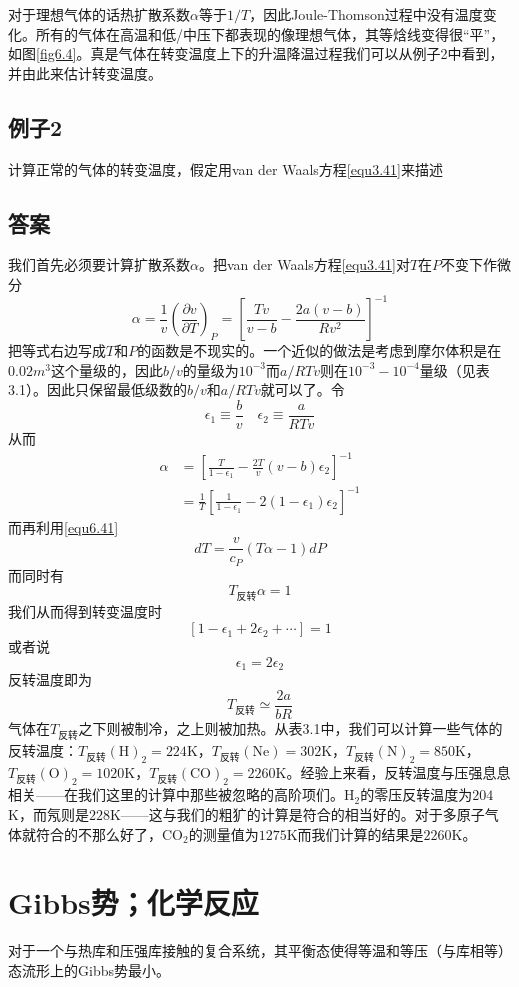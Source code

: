 对于理想气体的话热扩散系数$\alpha$等于$1/T$，因此Joule-Thomson过程中没有温度变化。所有的气体在高温和低/中压下都表现的像理想气体，其等焓线变得很“平”，如图\ref{fig6.4}。真是气体在转变温度上下的升温降温过程我们可以从例子2中看到，并由此来估计转变温度。

\subsection*{例子2}
计算正常的气体的转变温度，假定用van der Waals方程\eqref{equ3.41}来描述
\subsection*{答案}
我们首先必须要计算扩散系数$\alpha$。把van der Waals方程\eqref{equ3.41}对$T$在$P$不变下作微分
\[\alpha = \frac{1}{v}\left(\frac{\partial v}{\partial T}\right)_P=\left[\frac{Tv}{v-b}-\frac{2a(v-b)}{Rv^2}\right]^{-1} \]
把等式右边写成$T$和$P$的函数是不现实的。一个近似的做法是考虑到摩尔体积是在$0.02m^3$这个量级的，因此$b/v$的量级为$10^{-3}$而$a/RTv$则在$10^{-3}-10^{-4}$量级（见表3.1）。因此只保留最低级数的$b/v$和$a/RTv$就可以了。令
\[\epsilon_1\equiv\frac{b}{v}\quad \epsilon_2\equiv\frac{a}{RTv} \]
从而
\[\begin{split}
\alpha&=\left[\frac{T}{1-\epsilon_1}-\frac{2T}{v}(v-b)\epsilon_2\right]^{-1}\\
&=\frac{1}{T}\left[\frac{1}{1-\epsilon_1}-2(1-\epsilon_1)\epsilon_2\right]^{-1}
\end{split} \]
而再利用\eqref{equ6.41}
\[dT=\frac{v}{c_P}(T\alpha-1)dP \]
而同时有
\[T_{\text{反转}}\alpha=1 \]
我们从而得到转变温度时
\[[1-\epsilon_1+2\epsilon_2+\cdots]=1 \]
或者说
\[\epsilon_1=2\epsilon_2 \]
反转温度即为
\[T_{\text{反转}}\simeq\frac{2a}{bR} \]
气体在$T_{\text{反转}}$之下则被制冷，之上则被加热。从表3.1中，我们可以计算一些气体的反转温度：$T_{\text{反转}}(\mathrm{H})_2=224$K，$T_{\text{反转}}(\mathrm{Ne})=302$K，$T_{\text{反转}}(\mathrm{N})_2=850$K，$T_{\text{反转}}(\mathrm{O})_2=1020$K，$T_{\text{反转}}(\mathrm{CO})_2=2260$K。经验上来看，反转温度与压强息息相关——在我们这里的计算中那些被忽略的高阶项们。H$_2$的零压反转温度为$204$K，而氖则是$228$K——这与我们的粗犷的计算是符合的相当好的。对于多原子气体就符合的不那么好了，CO$_2$的测量值为$1275$K而我们计算的结果是$2260$K。



\section{Gibbs势；化学反应}
\label{sec6.4}
对于一个与热库和压强库接触的复合系统，其平衡态使得等温和等压（与库相等）态流形上的Gibbs势最小。

